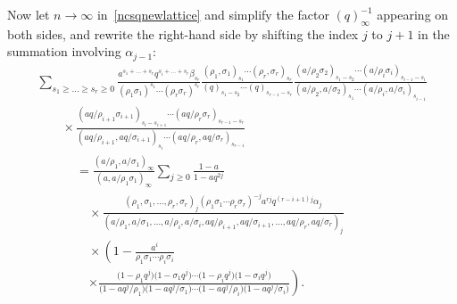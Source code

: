 \documentclass[pdftex]{sigma}
\numberwithin{equation}{section}
\begin{document}
{\samepage Now let $n\to\infty$ in~\eqref{ncsqnewlattice} and simplify the factor $(q)_\infty^{-1}$ appearing on both sides, and rewrite the right-hand side by shifting the index $j$ to $j+1$ in the summation involving $\alpha_{j-1}$:
\begin{gather}
\sum_{s_1\geq\dots\geq s_{r}\geq0}\frac{a^{s_1+\dots+s_r}q^{s_i+\dots+s_{r}}\beta_{s_r}}{(\rho_1\sigma_1)^{s_1}\cdots(\rho_r\sigma_r)^{s_r}}\frac{(\rho_1,\sigma_1)_{s_1}
\cdots(\rho_r,\sigma_r)_{s_r}}{(q)_{s_1-s_2}\cdots(q)_{s_{r-1}-s_r}}\frac{(a/\rho_2\sigma_2)_{s_1-s_2}\cdots(a/\rho_i\sigma_i)_{s_{i-1}-s_i}} {(a/\rho_2,a/\sigma_2)_{s_1}
\cdots(a/\rho_i,a/\sigma_i)_{s_{i-1}}}\nonumber\\
\qquad{}\times\frac{(aq/\rho_{i+1}\sigma_{i+1})_{s_i-s_{i+1}}\cdots(aq/\rho_r\sigma_r)_{s_{r-1}-s_r}}{(aq/\rho_{i+1},aq/\sigma_{i+1})_{s_i}
\cdots(aq/\rho_r,aq/\sigma_r)_{s_{r-1}}}\nonumber\\
\phantom{\qquad{}\times}{}
=\frac{(a/\rho_1,a/\sigma_1)_\infty}{(a,a/\rho_1\sigma_1)_\infty}\sum_{j\geq0}\frac{1-a}{1-aq^{2j}}\nonumber\\
\phantom{\qquad{}\times=}{}\times
\frac{(\rho_1,\sigma_1,\dots,\rho_r,\sigma_r)_j(\rho_1\sigma_1\cdots\rho_r\sigma_r)^{-j}a^{rj}q^{(r-i+1)j}\alpha_j}{(a/\rho_1,a/\sigma_1,
\dots,a/\rho_i,a/\sigma_i,aq/\rho_{i+1},aq/\sigma_{i+1},\dots,aq/\rho_r,aq/\sigma_r)_j}\nonumber\\
\phantom{\qquad{}\times=}{}\times\left( 1-\frac{a^{i}}{\rho_1\sigma_1\cdots\rho_i\sigma_i}\right.\nonumber\\
\phantom{\qquad{}\times=}{}\left.\times\frac{\bigl(1-\rho_1q^j\bigr)\bigl(1-\sigma_1q^j\bigr)
\cdots\bigl(1-\rho_iq^j\bigr)\bigl(1-\sigma_iq^j\bigr)}{\bigl(1-aq^j/\rho_1\bigr)\bigl(1-aq^j/\sigma_1\bigr)
\cdots\bigl(1-aq^j/\rho_i\bigr)\bigl(1-aq^j/\sigma_i\bigr)}\right).\label{newlattice}
\end{gather}}%
\end{document}
